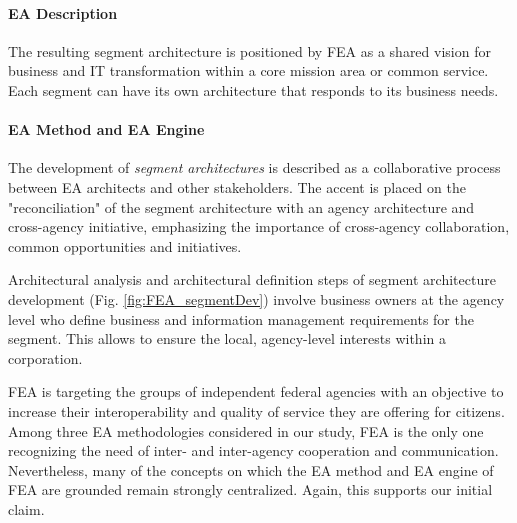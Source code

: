 \paragraph*{EA Description}

The resulting segment architecture is positioned by FEA as a shared vision for business and IT transformation within a core mission area or common service. Each segment can have its own architecture that responds to its business needs.

\paragraph*{EA Method and EA Engine}

The development of \textit{segment architectures} is described as a collaborative process between EA architects and other stakeholders. The accent is placed on the "reconciliation" of the segment architecture with an agency architecture and cross-agency initiative, emphasizing the importance of  cross-agency collaboration, common opportunities and initiatives.

Architectural analysis and architectural definition steps of segment architecture development (Fig. \ref{fig:FEA_segmentDev}) involve business owners at the agency level who define business and information management requirements for the segment. This allows to ensure the local, agency-level interests within a corporation. 

FEA is targeting the groups of independent federal agencies with an objective to increase their interoperability and quality of service they are offering for citizens. Among three EA methodologies considered in our study, FEA is the only one recognizing the need of inter- and inter-agency cooperation and communication. Nevertheless, many of the concepts on which the EA method and EA engine of FEA are grounded remain strongly centralized. Again, this supports our initial claim.

